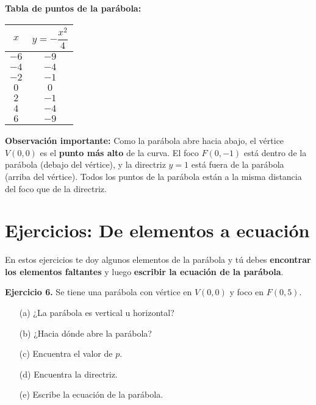 \documentclass[12pt,a4paper]{article}
\begin{document}
	\bigskip

	\textbf{Tabla de puntos de la parábola:}

	\begin{center}
		\begin{tabular}{|c|c|}
			\hline
			\(x\) & \(y=-\dfrac{x^2}{4}\) \\
			\hline
			\(-6\) & \(-9\) \\
			\hline
			\(-4\) & \(-4\) \\
			\hline
			\(-2\) & \(-1\) \\
			\hline
			\(0\) & \(0\) \\
			\hline
			\(2\) & \(-1\) \\
			\hline
			\(4\) & \(-4\) \\
			\hline
			\(6\) & \(-9\) \\
			\hline
		\end{tabular}
	\end{center}

	\bigskip

	\textbf{Observación importante:} Como la parábola abre hacia abajo, el vértice \(V(0,0)\) es el \textbf{punto más alto} de la curva. El foco \(F(0,-1)\) está dentro de la parábola (debajo del vértice), y la directriz \(y=1\) está fuera de la parábola (arriba del vértice). Todos los puntos de la parábola están a la misma distancia del foco que de la directriz.


	\section{Ejercicios: De elementos a ecuación}

	En estos ejercicios te doy algunos elementos de la parábola y tú debes \textbf{encontrar los elementos faltantes} y luego \textbf{escribir la ecuación de la parábola}.

	\bigskip

	\textbf{Ejercicio 6.} Se tiene una parábola con vértice en \(V(0,0)\) y foco en \(F(0,5)\).
	\begin{itemize}
		\item[(a)] ¿La parábola es vertical u horizontal?
		\item[(b)] ¿Hacia dónde abre la parábola?
		\item[(c)] Encuentra el valor de \(p\).
		\item[(d)] Encuentra la directriz.
		\item[(e)] Escribe la ecuación de la parábola.
	\end{itemize}
\end{document}

